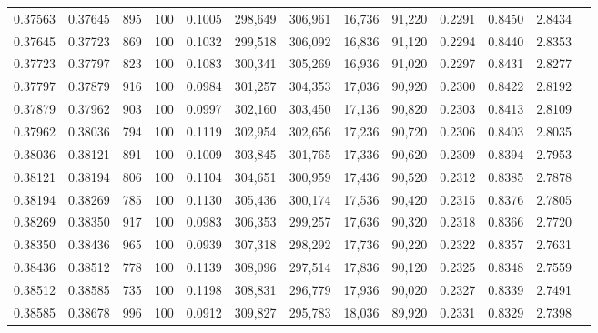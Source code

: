 \begin{tabular}{rrrrrrrrrrrrr}
0.37563 & 0.37645 &   895 & 100 &                                     0.1005 & 298,649 & 306,961 &  16,736 &  91,220 & 0.2291 & 0.8450 & 2.8434 \\
0.37645 & 0.37723 &   869 & 100 &                                     0.1032 & 299,518 & 306,092 &  16,836 &  91,120 & 0.2294 & 0.8440 & 2.8353 \\
0.37723 & 0.37797 &   823 & 100 &                                     0.1083 & 300,341 & 305,269 &  16,936 &  91,020 & 0.2297 & 0.8431 & 2.8277 \\
0.37797 & 0.37879 &   916 & 100 &                                     0.0984 & 301,257 & 304,353 &  17,036 &  90,920 & 0.2300 & 0.8422 & 2.8192 \\
0.37879 & 0.37962 &   903 & 100 &                                     0.0997 & 302,160 & 303,450 &  17,136 &  90,820 & 0.2303 & 0.8413 & 2.8109 \\
0.37962 & 0.38036 &   794 & 100 &                                     0.1119 & 302,954 & 302,656 &  17,236 &  90,720 & 0.2306 & 0.8403 & 2.8035 \\
0.38036 & 0.38121 &   891 & 100 &                                     0.1009 & 303,845 & 301,765 &  17,336 &  90,620 & 0.2309 & 0.8394 & 2.7953 \\
0.38121 & 0.38194 &   806 & 100 &                                     0.1104 & 304,651 & 300,959 &  17,436 &  90,520 & 0.2312 & 0.8385 & 2.7878 \\
0.38194 & 0.38269 &   785 & 100 &                                     0.1130 & 305,436 & 300,174 &  17,536 &  90,420 & 0.2315 & 0.8376 & 2.7805 \\
0.38269 & 0.38350 &   917 & 100 &                                     0.0983 & 306,353 & 299,257 &  17,636 &  90,320 & 0.2318 & 0.8366 & 2.7720 \\
0.38350 & 0.38436 &   965 & 100 &                                     0.0939 & 307,318 & 298,292 &  17,736 &  90,220 & 0.2322 & 0.8357 & 2.7631 \\
0.38436 & 0.38512 &   778 & 100 &                                     0.1139 & 308,096 & 297,514 &  17,836 &  90,120 & 0.2325 & 0.8348 & 2.7559 \\
0.38512 & 0.38585 &   735 & 100 &                                     0.1198 & 308,831 & 296,779 &  17,936 &  90,020 & 0.2327 & 0.8339 & 2.7491 \\
0.38585 & 0.38678 &   996 & 100 &                                     0.0912 & 309,827 & 295,783 &  18,036 &  89,920 & 0.2331 & 0.8329 & 2.7398 \\

\end{tabular}
